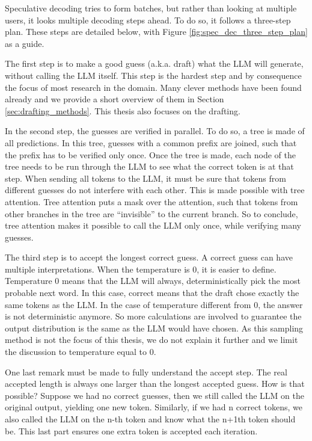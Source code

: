 Speculative decoding tries to form batches, but rather than looking at multiple users, it looks multiple decoding steps ahead. To do so, it follows a three-step plan. These steps are detailed below, with Figure \ref{fig:spec_dec_three_step_plan} as a guide.

The first step is to make a good guess (a.k.a. draft) what the LLM will generate, without calling the LLM itself. This step is the hardest step and by consequence the focus of most research in the domain. Many clever methods have been found already and we provide a short overview of them in Section \ref{sec:drafting_methods}. This thesis also focuses on the drafting.

In the second step, the guesses are verified in parallel. To do so, a tree is made of all predictions. In this tree, guesses with a common prefix are joined, such that the prefix has to be verified only once. Once the tree is made, each node of the tree needs to be run through the LLM to see what the correct token is at that step. When sending all tokens to the LLM, it must be sure that tokens from different guesses do not interfere with each other. This is made possible with tree attention. Tree attention puts a mask over the attention, such that tokens from other branches in the tree are ``invisible'' to the current branch. So to conclude, tree attention makes it possible to call the LLM only once, while verifying many guesses.

The third step is to accept the longest correct guess. A correct guess can have multiple interpretations. When the temperature is 0, it is easier to define. Temperature 0 means that the LLM will always, deterministically pick the most probable next word. In this case, correct means that the draft chose exactly the same tokens as the LLM. In the case of temperature different from 0, the answer is not deterministic anymore. So more calculations are involved to guarantee the output distribution is the same as the LLM would have chosen. As this sampling method is not the focus of this thesis, we do not explain it further and we limit the discussion to temperature equal to 0. 

One last remark must be made to fully understand the accept step. The real accepted length is always one larger than the longest accepted guess. How is that possible? Suppose we had no correct guesses, then we still called the LLM on the original output, yielding one new token. Similarly, if we had n correct tokens, we also called the LLM on the n-th token and know what the n+1th token should be. This last part ensures one extra token is accepted each iteration.

